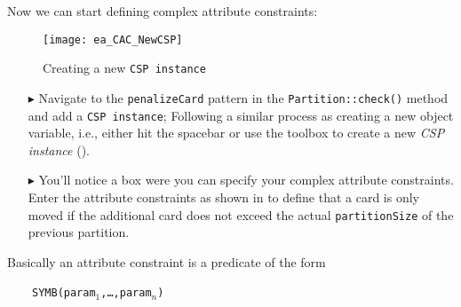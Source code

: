 Now we can start defining complex attribute constraints:
\begin{figure}[htbp]
\begin{center}
  \texttt{[image: ea\_CAC\_NewCSP]}
  \caption{Creating a new \texttt{CSP instance}}  
  \label{ea:CAC_NewCSP}
\end{center}
\end{figure}
\begin{itemize}    

\item[$\blacktriangleright$] Navigate to the \texttt{penalizeCard} pattern in the \texttt{Partition::check()} method and add a \texttt{CSP instance};  
Following a similar process as creating a new object variable, i.e., either hit the spacebar or use the toolbox to create a new \emph{CSP instance} ().

\item[$\blacktriangleright$] You’ll notice a box were you can specify your complex attribute constraints. Enter the attribute constraints as shown in  to define that a card is only moved if the additional card does not exceed the actual \texttt{partitionSize} of the previous partition.

\end{itemize}

Basically an attribute constraint is a predicate of the form

~~~~\texttt{SYMB(param$_1$,\ldots,param$_n$)}

